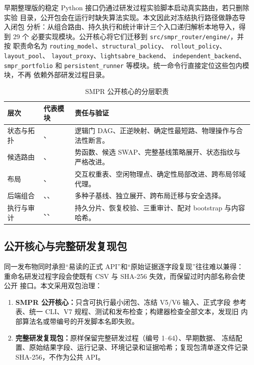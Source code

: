 \documentclass[11pt,a4paper]{article}
\begin{document}
早期整理版的稳定 Python 接口仍通过研发过程实验脚本启动真实路由，若只删除实验
目录，公开包会在运行时缺失算法实现。本文因此对冻结执行路径做静态导入闭包
分析：从组合路由、持久执行和统计审计三个入口递归解析本地导入，得到 29 个
必要实现模块。公开核心将它们迁移到 \texttt{src/smpr\_router/engine/}，并按
职责命名为 \texttt{routing\_model}、\texttt{structural\_policy}、
\texttt{rollout\_policy}、\texttt{layout\_pool}、
\texttt{layout\_proxy}、\texttt{lightsabre\_backend}、
\texttt{independent\_backend}、\texttt{smpr\_portfolio} 和
\texttt{persistent\_runner} 等模块。统一命令行直接定位这些包内模块，不再
依赖外部研发过程目录。

\begin{table}[H]
\centering
\small
\caption{SMPR 公开核心的分层职责}
\label{tab:software-layers}
\begin{tabularx}{\textwidth}{p{}p{}Y}
\toprule
层次 & 代表模块 & 责任与验证 \\
\midrule
状态与拓扑 &
、 &
逻辑门 DAG、正逆映射、确定性最短路、物理操作与合法性断言。\\
候选路由 &
、 &
势函数、候选 SWAP、完整基线策略展开、状态指纹与严格改进。\\
布局 &
、 &
交互权重表、空闲物理点、确定性局部改进、跨布局邻域代理。\\
后端组合 &
、、
 &
多种子基线、独立展开、跨布局迁移与安全选择。\\
执行与审计 &
、、
 &
持久分片、恢复校验、三重审计、配对 bootstrap 与内容哈希。\\
\bottomrule
\end{tabularx}
\end{table}

\subsection{公开核心与完整研发复现包}

同一发布物同时承担“易读的正式 API”和“原始证据逐字段复现”往往难以兼得：
重命名研发过程字段会使既有 CSV 与 SHA-256 失效，而保留过时内部名称会使公开
接口。本文采用双包治理：

\begin{enumerate}[label=(\arabic*),itemsep=0.30em]
  \item \textbf{SMPR 公开核心：}只含可执行最小闭包、冻结 V5/V6 输入、正式字段
  参考表、统一 CLI、V7 规程、测试和发布检查；构建器检查全部文本，发现旧
  内部算法名或带编号的开发脚本名即失败。
  \item \textbf{完整研发复现包：}原样保留完整研发过程（编号 1--64）、早期数据、
  冻结配置、原始结果字段、运行记录、环境记录和证据哈希；复现包清单逐文件记录
  SHA-256，不作为公共 API。
\end{enumerate}
\end{document}
